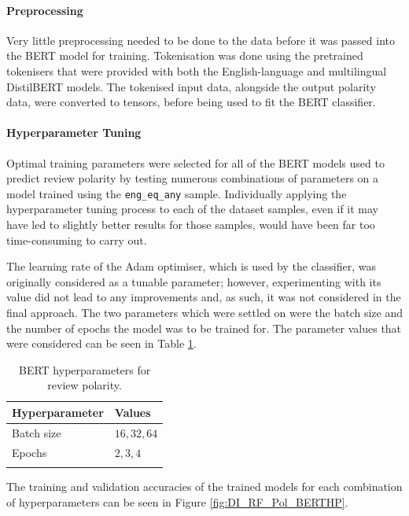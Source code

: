 \paragraph{Preprocessing}

Very little preprocessing needed to be done to the data before it was passed into the BERT model for training. Tokenisation was done using the pretrained tokenisers that were provided with both the English-language and multilingual DistilBERT models. The tokenised input data, alongside the output polarity data, were converted to tensors, before being used to fit the BERT classifier.

\paragraph{Hyperparameter Tuning}

Optimal training parameters were selected for all of the BERT models used to predict review polarity by testing numerous combinations of parameters on a model trained using the \texttt{eng\_eq\_any} sample. Individually applying the hyperparameter tuning process to each of the dataset samples, even if it may have led to slightly better results for those samples, would have been far too time-consuming to carry out.

The learning rate of the Adam optimiser, which is used by the classifier, was originally considered as a tunable parameter; however, experimenting with its value did not lead to any improvements and, as such, it was not considered in the final approach. The two parameters which were settled on were the batch size and the number of epochs the model was to be trained for. The parameter values that were considered can be seen in Table \ref{tab:DI_RF_Pol_BERTHP}.

\begin{table}[ht]
    \centering
    \begin{tabular}{l l}
        \toprule
        \textbf{Hyperparameter} & \textbf{Values}\\\midrule
        Batch size & $16, 32, 64$\\
        Epochs & $2, 3, 4$\\
        \bottomrule\\
    \end{tabular}
    \caption{BERT hyperparameters for review polarity.}
    \label{tab:DI_RF_Pol_BERTHP}
\end{table}

The training and validation accuracies of the trained models for each combination of hyperparameters can be seen in Figure \ref{fig:DI_RF_Pol_BERTHP}.

